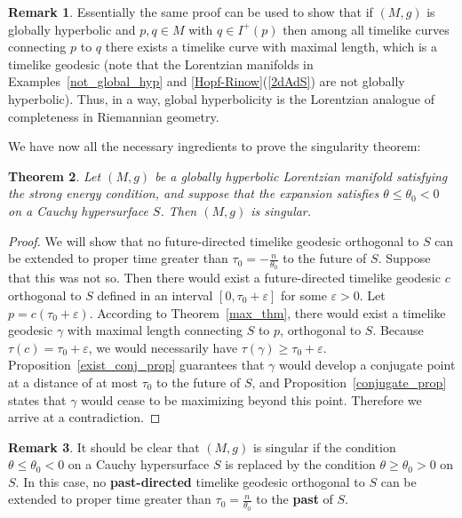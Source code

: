\documentclass[10pt]{amsart}
\newtheorem{Thm}{Theorem}[section]
\theoremstyle{definition}
\newtheorem{Remark}[Thm]{Remark}
\theoremstyle{remark}
\begin{document}
\begin{Remark}
Essentially the same proof can be used to show that if $(M,g)$ is globally hyperbolic and $p, q \in M$ with $q \in I^+(p)$ then among all timelike curves connecting $p$ to $q$ there exists a timelike curve with maximal length, which is a timelike geodesic (note that the Lorentzian manifolds in Examples~\ref{not_global_hyp} and \ref{Hopf-Rinow}(\ref{2dAdS}) are not globally hyperbolic). Thus, in a way, global hyperbolicity is the Lorentzian analogue of completeness in Riemannian geometry.
\end{Remark}

We have now all the necessary ingredients to prove the singularity theorem:

\begin{Thm} \label{sing_thm}
Let $(M,g)$ be a globally hyperbolic Lorentzian manifold satisfying the strong energy condition, and suppose that the expansion satisfies $\theta\leq\theta_0 < 0$ on a Cauchy hypersurface $S$. Then $(M,g)$ is singular.
\end{Thm}

\begin{proof}
We will show that no future-directed timelike geodesic orthogonal to $S$ can be extended to proper time greater than $\tau_0=-\frac{n}{\theta_0}$ to the future of $S$. Suppose that this was not so. Then there would exist a future-directed timelike geodesic $c$ orthogonal to $S$ defined in an interval $[0,\tau_0+\varepsilon]$ for some $\varepsilon>0$. Let $p=c(\tau_0+\varepsilon)$. According to Theorem~\ref{max_thm}, there would exist a timelike geodesic $\gamma$ with maximal length connecting $S$ to $p$, orthogonal to $S$. Because $\tau(c)=\tau_0+\varepsilon$, we would necessarily have $\tau(\gamma)\geq\tau_0+\varepsilon$. Proposition~\ref{exist_conj_prop} guarantees that $\gamma$ would develop a conjugate point at a distance of at most $\tau_0$ to the future of $S$, and Proposition~\ref{conjugate_prop} states that $\gamma$ would cease to be maximizing beyond this point. Therefore we arrive at a contradiction.
\end{proof}

\begin{Remark}
It should be clear that $(M,g)$ is singular if the condition $\theta\leq\theta_0 < 0$ on a Cauchy hypersurface $S$ is replaced by the condition $\theta\geq\theta_0 > 0$ on $S$. In this case, no {\bf past-directed} timelike geodesic orthogonal to $S$ can be extended to proper time greater than $\tau_0=\frac{n}{\theta_0}$ to the {\bf past} of $S$.
\end{Remark}
\end{document}
